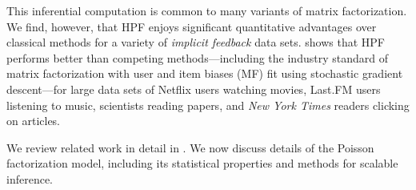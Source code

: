 

This inferential computation is common to many variants of matrix
factorization.  We find, however, that HPF enjoys significant
quantitative advantages over classical methods for a variety of
\emph{implicit feedback} data sets.  shows
that HPF performs better than competing methods---including the
industry standard of matrix factorization with user and item biases
(MF) fit using stochastic gradient descent---for large data sets
of Netflix users watching movies, Last.FM users listening to music,
scientists reading papers, and \textit{New York Times} readers
clicking on articles.

We review related work in detail in . We now discuss
details of the Poisson factorization model, including its statistical
properties and methods for scalable inference.






